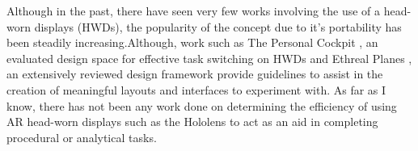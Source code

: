 Although in the past, there have seen very few works involving the use of a head-worn displays (HWDs), the popularity of the concept due to it's portability has been steadily increasing.Although, work such as The Personal Cockpit \cite{Ens2014}, an evaluated design space for effective task switching on HWDs and Ethreal Planes \cite{Ens2014a}, an extensively reviewed design framework provide guidelines to assist in the creation of meaningful layouts and interfaces to experiment with. As far as I know, there has not been any work done on determining the efficiency of using AR head-worn displays such as the Hololens to act as an aid in completing procedural or analytical tasks. 

